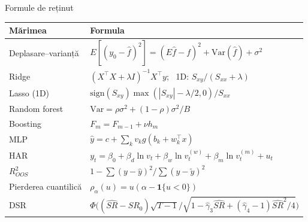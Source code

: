 \begin{frame}{Formule de reținut}
\itemsize{\small}
{\renewcommand{\arraystretch}{1.45}\begin{center}
\scriptsize
\begin{tabular}{ll}
\toprule
\textbf{Mărimea} & \textbf{Formula} \\
\midrule
Deplasare--varianță & $E[(y_0 - \hat f)^2] = (E\hat f - f)^2 + \mathrm{Var}(\hat f) + \sigma^2$ \\
Ridge & $(X^\top X + \lambda I)^{-1}X^\top y$; \ 1D: $S_{xy}/(S_{xx} + \lambda)$ \\
Lasso (1D) & $\mathrm{sign}(S_{xy})\max(|S_{xy}| - \lambda/2, 0)/S_{xx}$ \\
Random forest & $\mathrm{Var} = \rho\sigma^2 + (1 - \rho)\sigma^2/B$ \\
Boosting & $F_m = F_{m-1} + \nu h_m$ \\
MLP & $\hat y = c + \sum_k v_k g(b_k + w_k^\top x)$ \\
HAR & $y_t = \beta_0 + \beta_d\ln v_t + \beta_w\ln v_t^{(w)} + \beta_m\ln v_t^{(m)} + u_t$ \\
$R^2_{OOS}$ & $1 - \sum(y - \hat y)^2/\sum(y - \tilde y)^2$ \\
Pierderea cuantilică & $\rho_\alpha(u) = u(\alpha - \mathbf{1}\{u < 0\})$ \\
DSR & $\Phi\big((\widehat{SR} - SR_0)\sqrt{T - 1}/\sqrt{1 - \hat\gamma_3\widehat{SR} + (\hat\gamma_4 - 1)\widehat{SR}^2/4}\big)$ \\
\bottomrule
\end{tabular}
\end{center}
}
\end{frame}

